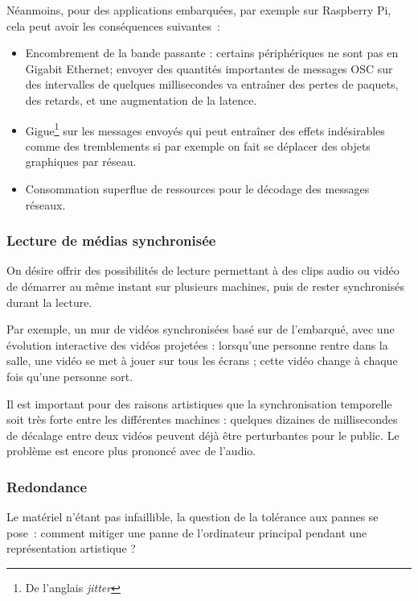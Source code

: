 \documentclass{article}
\begin{document}
Néanmoins, pour des applications embarquées, par exemple sur Raspberry Pi, cela peut avoir les conséquences suivantes~: 
\begin{itemize}
    \item Encombrement de la bande passante : certains périphériques ne sont pas en Gigabit Ethernet; envoyer des quantités importantes de messages OSC sur des intervalles de quelques millisecondes va entraîner des pertes de paquets, des retards, et une augmentation de la latence.
    \item Gigue\footnote{De l'anglais \textit{jitter}} sur les messages envoyés qui peut entraîner des effets indésirables comme des tremblements si par exemple on fait se déplacer des objets graphiques par réseau.
    \item Consommation superflue de ressources pour le décodage des messages réseaux.
\end{itemize}


\subsubsection{Lecture de médias synchronisée}
On désire offrir des possibilités de lecture permettant à 
des clips audio ou vidéo de démarrer au même instant sur plusieurs machines, 
puis de rester synchronisés durant la lecture.

Par exemple, un mur de vidéos synchronisées basé sur de l'embarqué, avec 
une évolution interactive des vidéos projetées : lorsqu'une personne rentre dans la salle, une vidéo se met à jouer sur tous les écrans ; cette vidéo change à chaque fois qu'une personne sort.

Il est important pour des raisons artistiques que la synchronisation temporelle soit très forte entre les différentes machines : quelques dizaines de millisecondes de décalage entre deux vidéos peuvent déjà être perturbantes pour le public. 
Le problème est encore plus prononcé avec de l'audio.

\subsubsection{Redondance}
Le matériel n'étant pas infaillible, la question de la tolérance aux pannes se pose~: comment mitiger une panne de l'ordinateur principal pendant une représentation artistique ?
\end{document}
